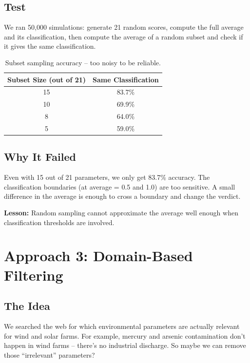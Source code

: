 \documentclass[12pt,a4paper]{article}
\begin{document}
\subsection{Test}

We ran 50,000 simulations: generate 21 random scores, compute the full average and its classification, then compute the average of a random subset and check if it gives the same classification.

\begin{table}[H]
\centering
\begin{tabular}{cc}
\toprule
\textbf{Subset Size (out of 21)} & \textbf{Same Classification} \\
\midrule
15 & 83.7\% \\
10 & 69.9\% \\
8 & 64.0\% \\
5 & 59.0\% \\
\bottomrule
\end{tabular}
\caption{Subset sampling accuracy -- too noisy to be reliable.}
\end{table}

\subsection{Why It Failed}

Even with 15 out of 21 parameters, we only get 83.7\% accuracy. The classification boundaries (at average = 0.5 and 1.0) are too sensitive. A small difference in the average is enough to cross a boundary and change the verdict.

\textbf{Lesson:} Random sampling cannot approximate the average well enough when classification thresholds are involved.

\section{Approach 3: Domain-Based Filtering}

\subsection{The Idea}

We searched the web for which environmental parameters are actually relevant for wind and solar farms. For example, mercury and arsenic contamination don't happen in wind farms -- there's no industrial discharge. So maybe we can remove those ``irrelevant'' parameters?
\end{document}
